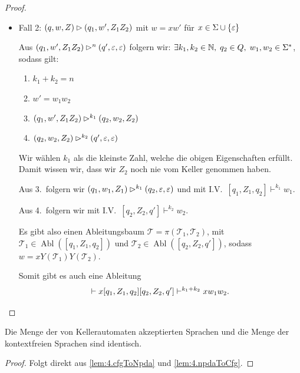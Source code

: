 \begin{proof}
\begin{description}
\begin{itemize}
\begin{itemize}
      Aus $(q'', w',Z')\ConfRel^n (q',\Eps,\Eps)$ folgern wir mit I.V.\
      $[q'', Z',q']\vdash^n w'$.
      Nach Konstruktion können wir $[q,Z,q']\vdash x [q'', Z',q']$ ableiten.

      
      \item Fall 2: $(q,w,Z)\rhd (q_1, w',Z_1Z_2)$ mit $w=xw'$ für $x\in\Sigma\cup\{\varepsilon\}$

            Aus $(q_1, w',Z_1Z_2)\rhd^n (q',\varepsilon,\varepsilon)$ folgern wir:
      $\exists k_1,k_2\in\mathbb{N}, \; q_2\in Q, \; w_1,w_2\in \Sigma^*$, sodass gilt:
      \begin{enumerate}
      \item $k_1+k_2=n$
      \item $w'=w_1w_2$
      \item $(q_1, w',Z_1Z_2)\rhd^{k_1} (q_2, w_2,Z_2)$
      \item $(q_2, w_2,Z_2)\rhd^{k_2} (q',\varepsilon,\varepsilon)$
      \end{enumerate}
      Wir wählen $k_1$ als die kleinste Zahl, welche die obigen Eigenschaften erfüllt.
      Damit wissen wir, dass wir $Z_2$ noch nie vom Keller genommen haben.
      
      Aus 3.\ folgern wir $(q_1, w_1,Z_1)\rhd^{k_1} (q_2, \varepsilon,\varepsilon)$ und mit I.V.\
      $[q_1, Z_1, q_2] \vdash^{k_1} w_1$.
      
      Aus 4.\ folgern wir mit I.V.\ $[q_2, Z_2, q'] \vdash^{k_2} w_2$.
      
      Es gibt also einen Ableitungsbaum $\mathcal{T} = \pi(\mathcal{T}_1,\mathcal{T}_2)$, mit $\mathcal{T}_1 \in \operatorname{Abl}([q_1, Z_1, q_2])$ und $\mathcal{T}_2 \in \operatorname{Abl}([q_2, Z_2, q'])$, sodass $w = xY(\mathcal{T}_1)Y(\mathcal{T}_2)$.
      
      Somit gibt es auch eine Ableitung
      \begin{equation*}
      [q, Z, q'] \vdash x[q_1,Z_1,q_2][q_2, Z_2, q'] \vdash^{k_1+k_2} xw_1w_2. \qedhere
      \end{equation*}
      \end{itemize}
    	 
    \end{itemize}
    \end{description}

\end{proof}

\begin{Satz}
Die Menge der von Kellerautomaten akzeptierten Sprachen und die Menge der kontextfreien Sprachen sind identisch.
\end{Satz}
\begin{proof}
Folgt direkt aus \autoref{lem:4.cfgToNpda} und \autoref{lem:4.npdaToCfg}.
\end{proof}

